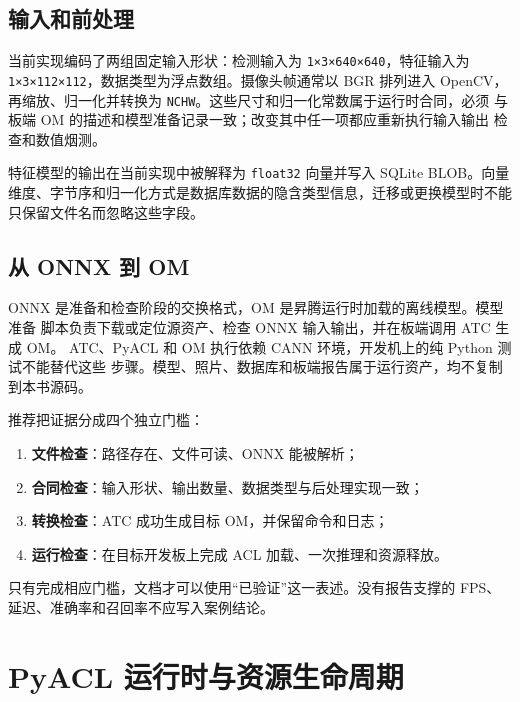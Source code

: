 \subsection{输入和前处理}\label{ux8f93ux5165ux548cux524dux5904ux7406}

当前实现编码了两组固定输入形状：检测输入为
\passthrough{\lstinline!1×3×640×640!}，特征输入为
\passthrough{\lstinline!1×3×112×112!}，数据类型为浮点数组。摄像头帧通常以
BGR 排列进入 OpenCV， 再缩放、归一化并转换为
\passthrough{\lstinline!NCHW!}。这些尺寸和归一化常数属于运行时合同，必须
与板端 OM 的描述和模型准备记录一致；改变其中任一项都应重新执行输入输出
检查和数值烟测。

特征模型的输出在当前实现中被解释为 \passthrough{\lstinline!float32!}
向量并写入 SQLite BLOB。向量
维度、字节序和归一化方式是数据库数据的隐含类型信息，迁移或更换模型时不能
只保留文件名而忽略这些字段。

\subsection{从 ONNX 到 OM}\label{ux4ece-onnx-ux5230-om}

ONNX 是准备和检查阶段的交换格式，OM 是昇腾运行时加载的离线模型。模型准备
脚本负责下载或定位源资产、检查 ONNX 输入输出，并在板端调用 ATC 生成 OM。
ATC、PyACL 和 OM 执行依赖 CANN 环境，开发机上的纯 Python
测试不能替代这些
步骤。模型、照片、数据库和板端报告属于运行资产，均不复制到本书源码。

推荐把证据分成四个独立门槛：

\begin{enumerate}
\def\labelenumi{\arabic{enumi}.}
\tightlist
\item
  \textbf{文件检查}：路径存在、文件可读、ONNX 能被解析；
\item
  \textbf{合同检查}：输入形状、输出数量、数据类型与后处理实现一致；
\item
  \textbf{转换检查}：ATC 成功生成目标 OM，并保留命令和日志；
\item
  \textbf{运行检查}：在目标开发板上完成 ACL 加载、一次推理和资源释放。
\end{enumerate}

只有完成相应门槛，文档才可以使用``已验证''这一表述。没有报告支撑的 FPS、
延迟、准确率和召回率不应写入案例结论。

\section{PyACL
运行时与资源生命周期}\label{pyacl-ux8fd0ux884cux65f6ux4e0eux8d44ux6e90ux751fux547dux5468ux671f}


